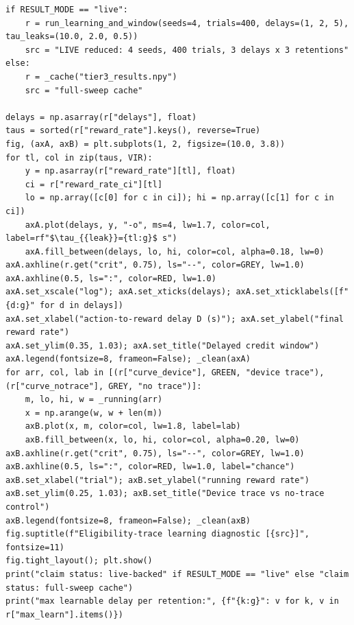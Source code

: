 \begin{lstlisting}[caption={01\_trace\_and\_credit\_window.ipynb code cell 3},label={lst:mrl-nb-01-trace-and-credit-window-3}]
if RESULT_MODE == "live":
    r = run_learning_and_window(seeds=4, trials=400, delays=(1, 2, 5), tau_leaks=(10.0, 2.0, 0.5))
    src = "LIVE reduced: 4 seeds, 400 trials, 3 delays x 3 retentions"
else:
    r = _cache("tier3_results.npy")
    src = "full-sweep cache"

delays = np.asarray(r["delays"], float)
taus = sorted(r["reward_rate"].keys(), reverse=True)
fig, (axA, axB) = plt.subplots(1, 2, figsize=(10.0, 3.8))
for tl, col in zip(taus, VIR):
    y = np.asarray(r["reward_rate"][tl], float)
    ci = r["reward_rate_ci"][tl]
    lo = np.array([c[0] for c in ci]); hi = np.array([c[1] for c in ci])
    axA.plot(delays, y, "-o", ms=4, lw=1.7, color=col, label=rf"$\tau_{{leak}}={tl:g}$ s")
    axA.fill_between(delays, lo, hi, color=col, alpha=0.18, lw=0)
axA.axhline(r.get("crit", 0.75), ls="--", color=GREY, lw=1.0)
axA.axhline(0.5, ls=":", color=RED, lw=1.0)
axA.set_xscale("log"); axA.set_xticks(delays); axA.set_xticklabels([f"{d:g}" for d in delays])
axA.set_xlabel("action-to-reward delay D (s)"); axA.set_ylabel("final reward rate")
axA.set_ylim(0.35, 1.03); axA.set_title("Delayed credit window")
axA.legend(fontsize=8, frameon=False); _clean(axA)
for arr, col, lab in [(r["curve_device"], GREEN, "device trace"), (r["curve_notrace"], GREY, "no trace")]:
    m, lo, hi, w = _running(arr)
    x = np.arange(w, w + len(m))
    axB.plot(x, m, color=col, lw=1.8, label=lab)
    axB.fill_between(x, lo, hi, color=col, alpha=0.20, lw=0)
axB.axhline(r.get("crit", 0.75), ls="--", color=GREY, lw=1.0)
axB.axhline(0.5, ls=":", color=RED, lw=1.0, label="chance")
axB.set_xlabel("trial"); axB.set_ylabel("running reward rate")
axB.set_ylim(0.25, 1.03); axB.set_title("Device trace vs no-trace control")
axB.legend(fontsize=8, frameon=False); _clean(axB)
fig.suptitle(f"Eligibility-trace learning diagnostic [{src}]", fontsize=11)
fig.tight_layout(); plt.show()
print("claim status: live-backed" if RESULT_MODE == "live" else "claim status: full-sweep cache")
print("max learnable delay per retention:", {f"{k:g}": v for k, v in r["max_learn"].items()})
\end{lstlisting}

